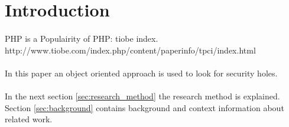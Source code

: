 \documentclass[main.tex]{subfiles}
\begin{document}
    \section{Introduction}\label{sec:introduction}

    \paragraph{} %
        PHP is a Populairity of PHP: tiobe index. http://www.tiobe.com/index.php/content/paperinfo/tpci/index.html
        
    \paragraph{} %
        
       
    \paragraph{} %
        In this paper an object oriented approach is used to look for security holes.
       
    \paragraph{} %
        In the next section \ref{sec:research_method} the research method is explained.
        Section \ref{sec:background} contains background and context information about related work.
        
        
                    
\end{document}
